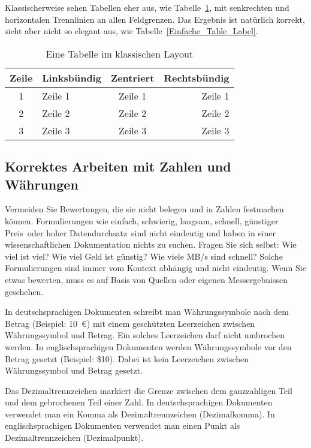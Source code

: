 \documentclass{llncs}
\begin{document}
Klassischerweise sehen Tabellen eher aus, wie Tabelle~\ref{Standard_Table_Label}, mit senkrechten und horizontalen Trennlinien an allen Feldgrenzen. Das Ergebnis ist natürlich korrekt, sieht aber nicht so elegant aus, wie Tabelle~\ref{Einfache_Table_Label}.

\begin{table}
\centering
\caption{Eine Tabelle im klassischen Layout}\label{Standard_Table_Label}
\begin{tabular}{|c|l|c|r|}
\hline
  \textbf{Zeile} & \textbf{Linksbündig} & \textbf{Zentriert} & \textbf{Rechtsbündig} \\
\hline
  1 & Zeile 1 & Zeile 1 & Zeile 1 \\ \hline
  2 & Zeile 2 & Zeile 2 & Zeile 2 \\ \hline
  3 & Zeile 3 & Zeile 3 & Zeile 3 \\ \hline
\end{tabular}
\end{table}


\subsection{Korrektes Arbeiten mit Zahlen und Währungen}

Vermeiden Sie Bewertungen, die sie nicht belegen und in Zahlen festmachen können. Formulierungen wie \glqq einfach\grqq, \glqq schwierig\grqq, \glqq langsam\grqq, \glqq schnell\grqq, \glqq günstiger Preis\grqq\ oder \glqq hoher Datendurchsatz\grqq\ sind nicht eindeutig und haben in einer wissenschaftlichen Dokumentation nichts zu suchen. Fragen Sie sich selbst: Wie viel ist viel? Wie viel Geld ist günstig? Wie viele MB/s sind schnell? Solche Formulierungen sind immer vom Kontext abhängig und nicht eindeutig. Wenn Sie etwas bewerten, muss es auf Basis von Quellen oder eigenen Messergebnissen geschehen.

In deutschsprachigen Dokumenten schreibt man Währungssymbole nach dem Betrag (Beispiel: 10~\euro) mit einem geschützten Leerzeichen zwischen Währungssymbol und Betrag. Ein solches Leerzeichen darf nicht umbrochen werden. In englischsprachigen Dokumenten werden Währungssymbole vor den Betrag gesetzt (Beispiel: \$10). Dabei ist kein Leerzeichen zwischen Währungssymbol und Betrag gesetzt.

Das Dezimaltrennzeichen markiert die Grenze zwischen dem ganzzahligen Teil und dem gebrochenen Teil einer Zahl. In deutschsprachigen Dokumenten verwendet man ein Komma als Dezimaltrennzeichen (Dezimalkomma). In englischsprachigen Dokumenten verwendet man einen Punkt als Dezimaltrennzeichen (Dezimalpunkt).
\end{document}
